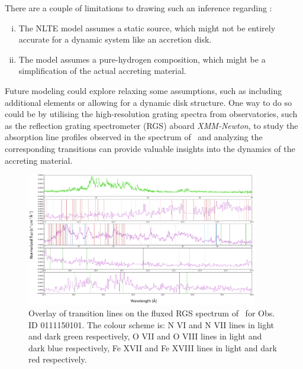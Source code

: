     There are a couple of limitations to drawing such an inference regarding \source:
    \begin{enumerate}[i.]
    	\item The NLTE model assumes a static source, which might not be entirely accurate for a dynamic system like an accretion disk.
    	\item The model assumes a pure-hydrogen composition, which might be a simplification of the actual accreting material.
    \end{enumerate}
    
    Future modeling could explore relaxing some assumptions, such as including additional elements or allowing for a dynamic disk structure. One way to do so could be by utilising the high-resolution grating spectra from observatories, such as the reflection grating spectrometer (RGS) aboard \textit{XMM-Newton}, to study the absorption line profiles observed in the spectrum of \source\ and analyzing the corresponding transitions can provide valuable insights into the dynamics of the accreting material.
    \begin{figure}[!htb]
    	\centering
    	\includegraphics[width=0.9\textwidth]{figures/fig-line_identification-rgs.png}
    	\caption{Overlay of transition lines on the fluxed RGS spectrum of \source\ for Obs. ID 0111150101. The colour scheme is: N VI and N VII lines in light and dark green respectively, O VII and O VIII lines in light and dark blue respectively, Fe XVII and Fe XVIII lines in light and dark red respectively.}
    	\label{fig:rgs-line-overlay}  
    \end{figure}
    
